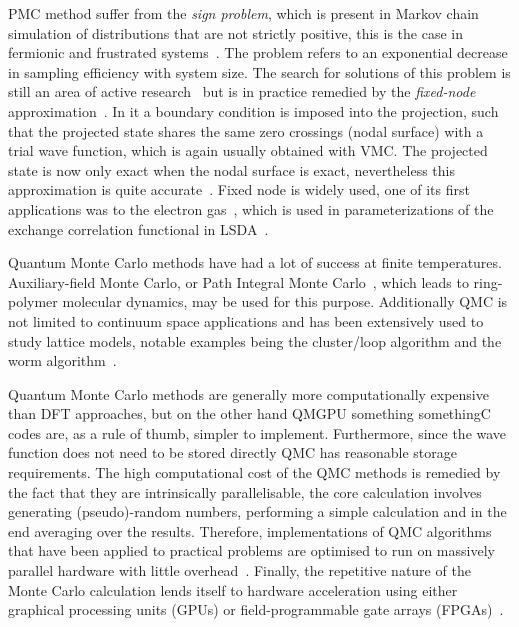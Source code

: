 \documentclass[final,3p,times,twocolumn]{elsarticle}
\begin{document}
		PMC method suffer from the \emph{sign problem}, which is present in Markov chain simulation of distributions that are not strictly positive, this is the case in fermionic and frustrated systems~\cite{gubernatis_kawashima_werner_2016}. The problem refers to an exponential decrease in sampling efficiency with system size. The search for solutions of this problem is still an area of active research~\cite{foulkes2001quantum} but is in practice remedied by the \emph{fixed-node} approximation~\cite{anderson1975random}. In it a boundary condition is imposed into the projection, such that the projected state shares the same zero crossings (nodal surface) with a trial wave function, which is again usually obtained with VMC. The projected state is now only exact when the nodal surface is exact, nevertheless this approximation is quite accurate~\cite{foulkes2001quantum}. Fixed node is widely used, one of its first applications was to the electron gas~\cite{ceperley1980ground}, which is used in parameterizations of the  exchange correlation functional in LSDA~\cite{vosko1980accurate}.
	
		Quantum Monte Carlo methods have had a lot of success at finite temperatures. Auxiliary-field Monte Carlo, or Path Integral Monte Carlo~\cite{ceperley1995path}, which leads to ring-polymer molecular dynamics, may be used for this purpose. Additionally QMC is not limited to continuum space applications and has been extensively used to study lattice models, notable examples being the cluster/loop algorithm and the worm algorithm~\cite{gubernatis_kawashima_werner_2016, prokof1998exact}.
	
		Quantum Monte Carlo methods are generally more computationally expensive than DFT approaches, but on the other hand QMGPU something somethingC codes are, as a rule of thumb, simpler to implement. Furthermore, since the wave function does not need to be stored directly QMC has reasonable storage requirements. The high computational cost of the QMC methods is remedied by the fact that they are intrinsically parallelisable, the core calculation involves generating (pseudo)-random numbers, performing a simple calculation and in the end averaging over the results. Therefore, implementations of QMC algorithms that have been applied to practical problems are optimised to run on massively parallel hardware with little overhead~\cite{needs2020variational}. Finally, the repetitive nature of the Monte Carlo calculation lends itself to hardware acceleration using either graphical processing units (GPUs) or field-programmable gate arrays (FPGAs)~\cite{austin2012quantum}.
		
\end{document}
